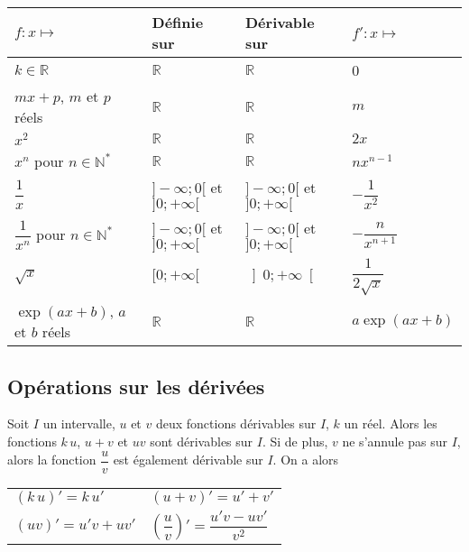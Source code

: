 \documentclass[11pt,fleqn, openany]{book} %
\begin{document}
\renewcommand{\arraystretch}{2}
\begin{center}
\begin{tabularx}{\linewidth}{|X|X|X|X|}
\hline
$f:x\mapsto$ & Définie sur & Dérivable sur & $f':x \mapsto $ \\
\hline
$k\in\mathbb{R}$  & $\mathbb{R}$ & $\mathbb{R}$ & 0\\
$mx+p$, $m$ et $p$ réels &  $\mathbb{R}$ & $\mathbb{R}$ & $m$\\
$x^2$ &  $\mathbb{R}$ & $\mathbb{R}$ & $2x$\\
$x^n$ pour $n\in\mathbb{N}^*$ & $\mathbb{R}$ & $\mathbb{R}$ & $nx^{n-1}$\\
$\dfrac{1}{x}$ & $]-\infty;0[$ et $]0;+\infty[$ & $]-\infty;0[$ et $]0;+\infty[$ & $-\dfrac{1}{x^2}$\\
$\dfrac{1}{x^n}$ pour $n\in\mathbb{N}^*$ & $]-\infty;0[$ et $]0;+\infty[$& $]-\infty;0[$ et $]0;+\infty[$ & $-\dfrac{n}{x^{n+1}}$\\
$\sqrt{x}$ & $[0;+\infty[$ & $\left]0;+\infty \right[$ & $\dfrac{1}{2\sqrt{x}}$\\
$\exp (ax+b)$, $a$ et $b$ réels & $\mathbb{R}$ & $\mathbb{R}$ & $a\exp (ax+b)$  \\
\hline\end{tabularx}
\end{center}

\subsection{Opérations sur les dérivées}

\begin{theorem}Soit $I$ un intervalle, $u$ et $v$ deux fonctions dérivables sur $I$, $k$ un réel. Alors les fonctions $k\,u$, $u+v$ et $uv$ sont dérivables sur $I$. Si de plus, $v$ ne s'annule pas sur $I$, alors la fonction $\dfrac{u}{v}$ est également dérivable sur $I$. On a alors
\begin{center}
\begin{tabularx}{0.6\linewidth}{XX}
$(k\,u)' = k\, u'$ & $(u+v)'=u'+v'$ \\
$(uv)'=u'v+uv'$ & $\left(\dfrac{u}{v}\right)' = \dfrac{u'v-uv'}{v^2}$

\end{tabularx}
\end{center}
\vspace{-0.5cm}
\end{theorem}
\end{document}
